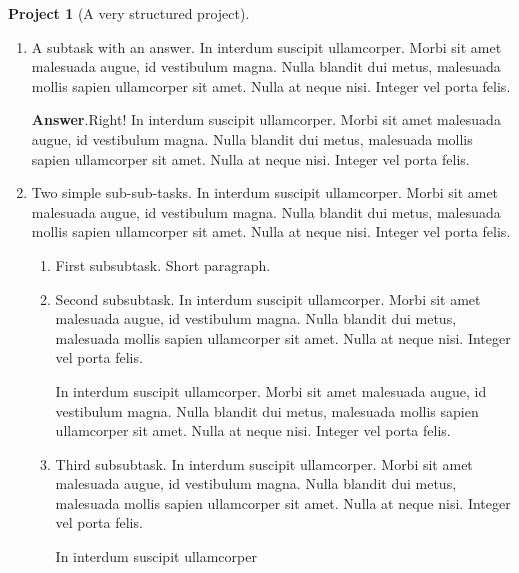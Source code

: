 \documentclass{amsart}
\theoremstyle{plain}%
\theoremstyle{definition}%
\newtheorem{project}[theorem]{Project}
\theoremstyle{remark}%
\newcommand{\blocktitlefont}{\relax}
\numberwithin{equation}{section}
\begin{document}
\begin{project}[A very structured project]
\begin{enumerate}[font=\bfseries,label=(\alph*),ref=\alph*]
\begin{enumerate}[font=\bfseries,label=(\roman*),ref=\theenumi.\roman*]
A short paragraph, before an answer.%
\par\smallskip%
\noindent\textbf{\blocktitlefont Answer}.\hypertarget{project-structured-6-2-2}{}\quad{}With a proof.%
\begin{proof}\label{project-structured-6-2-2-2}%
In interdum suscipit ullamcorper. Morbi sit amet malesuada augue, id vestibulum magna. Nulla blandit dui metus, malesuada mollis sapien ullamcorper sit amet. Nulla at neque nisi. Integer vel porta felis.%
\end{proof}
And a bit more to say.%
\item{}A subtask with an answer.  In interdum suscipit ullamcorper. Morbi sit amet malesuada augue, id vestibulum magna. Nulla blandit dui metus, malesuada mollis sapien ullamcorper sit amet. Nulla at neque nisi. Integer vel porta felis.%
\par\smallskip%
\noindent\textbf{\blocktitlefont Answer}.\hypertarget{project-structured-6-3-2}{}\quad{}Right!  In interdum suscipit ullamcorper. Morbi sit amet malesuada augue, id vestibulum magna. Nulla blandit dui metus, malesuada mollis sapien ullamcorper sit amet. Nulla at neque nisi. Integer vel porta felis.%
\item\label{project-task-level-two}Two simple sub-sub-tasks.  In interdum suscipit ullamcorper. Morbi sit amet malesuada augue, id vestibulum magna. Nulla blandit dui metus, malesuada mollis sapien ullamcorper sit amet. Nulla at neque nisi. Integer vel porta felis.%
\begin{enumerate}[font=\bfseries,label=(\Alph*),ref=\theenumi.\theenumii.\Alph*]%
\item{}First subsubtask.  Short paragraph.%
\item{}Second subsubtask.  In interdum suscipit ullamcorper. Morbi sit amet malesuada augue, id vestibulum magna. Nulla blandit dui metus, malesuada mollis sapien ullamcorper sit amet. Nulla at neque nisi. Integer vel porta felis.%
\par
In interdum suscipit ullamcorper. Morbi sit amet malesuada augue, id vestibulum magna. Nulla blandit dui metus, malesuada mollis sapien ullamcorper sit amet. Nulla at neque nisi. Integer vel porta felis.%
\item\label{deep-terminal-task}Third subsubtask.  In interdum suscipit ullamcorper. Morbi sit amet malesuada augue, id vestibulum magna. Nulla blandit dui metus, malesuada mollis sapien ullamcorper sit amet. Nulla at neque nisi. Integer vel porta felis.%
\par
In interdum suscipit ullamcorper%

\end{enumerate}
\end{enumerate}
\end{enumerate}
\end{project}
\end{document}
